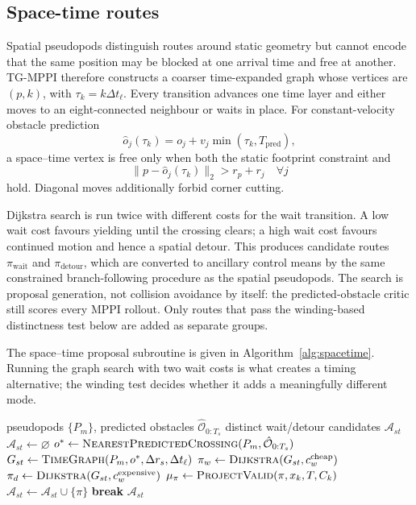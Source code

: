 \documentclass[journal]{IEEEtran}
\begin{document}
\subsection{Space-time routes}
Spatial pseudopods distinguish routes around static geometry but cannot encode
that the same position may be blocked at one arrival time and free at another.
TG-MPPI therefore constructs a coarser time-expanded graph whose vertices are
$(p,k)$, with $\tau_k=k\Delta t_\ell$. Every transition advances one time
layer and either moves to an eight-connected neighbour or waits in place. For
constant-velocity obstacle prediction
\begin{equation}
 \hat o_j(\tau_k)=o_j+v_j\min(\tau_k,T_{\mathrm{pred}}),
 \label{eq:cv-prediction}
\end{equation}
a space--time vertex is free only when both the static footprint constraint and
\begin{equation}
 \lVert p-\hat o_j(\tau_k)\rVert_2>r_p+r_j
 \quad\forall j
 \label{eq:spacetime-free-short}
\end{equation}
hold. Diagonal moves additionally forbid corner cutting.

Dijkstra search is run twice with different costs for the wait transition. A
low wait cost favours yielding until the crossing clears; a high wait cost
favours continued motion and hence a spatial detour. This produces candidate
routes $\pi_{\mathrm{wait}}$ and $\pi_{\mathrm{detour}}$, which are converted
to ancillary control means by the same constrained branch-following procedure
as the spatial pseudopods. The search is proposal generation, not collision
avoidance by itself: the predicted-obstacle critic still scores every MPPI
rollout. Only routes that pass the winding-based distinctness test below are
added as separate groups.

The space--time proposal subroutine is given in
Algorithm~\ref{alg:spacetime}. Running the graph search with two wait costs is
what creates a timing alternative; the winding test decides whether it adds a
meaningfully different mode.

\begin{algorithm}[t]
\caption{Space--Time Alternative Generation}
\label{alg:spacetime}
\begin{algorithmic}[1]
\Require pseudopods $\{P_m\}$, predicted obstacles $\hat{\mathcal O}_{0:T_s}$
\Ensure distinct wait/detour candidates $\mathcal A_{st}$
\State $\mathcal A_{st}\gets\varnothing$
  \State $o^*\gets\Call{NearestPredictedCrossing}{P_m,\hat{\mathcal O}_{0:T_s}}$
    \State $G_{st}\gets\Call{TimeGraph}{P_m,o^*,\Delta r_s,\Delta t_\ell}$
    \State $\pi_w\gets\Call{Dijkstra}{G_{st},c_w^{\mathrm{cheap}}}$
    \State $\pi_d\gets\Call{Dijkstra}{G_{st},c_w^{\mathrm{expensive}}}$
      \State $\mu_\pi\gets\Call{ProjectValid}{\pi,x_k,T,C_k}$
        \State $\mathcal A_{st}\gets\mathcal A_{st}\cup\{\pi\}$
      \EndIf
    \EndFor
    \State \textbf{break} 
  \EndIf
\EndFor
\State \Return $\mathcal A_{st}$
\end{algorithmic}
\end{algorithm}
\end{document}
